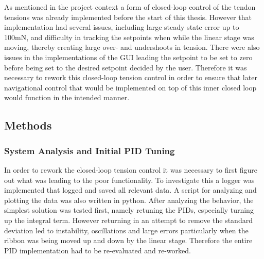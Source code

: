 As mentioned in the project context a form of closed-loop control of the tendon tensions was already implemented before the start of this thesis. However that implementation had several issues, including large steady state error up to 100mN, and difficulty in tracking the setpoints when while the linear stage was moving, thereby creating large over- and undershoots in tension. There were also issues in the implementations of the GUI leading the setpoint to be set to zero before being set to the desired setpoint decided by the user. Therefore it was necessary to rework this closed-loop tension control in order to ensure that later navigational control that would be implemented on top of this inner closed loop would function in the intended manner.

\subsection{Methods}

\subsubsection{System Analysis and Initial PID Tuning}
In order to rework the closed-loop tension control it was necessary to first figure out what was leading to the poor functionality. To investigate this a logger was implemented that logged and saved all relevant data. A script for analyzing and plotting the data was also written in python. 
\newline \newline
After analyzing the behavior, the simplest solution was tested first, namely retuning the PIDs, especially turning up the integral term. However returning in an attempt to remove the standard deviation led to instability, oscillations and large errors particularly when the ribbon was being moved up and down by the linear stage. Therefore the entire PID implementation had to be re-evaluated and re-worked. 

